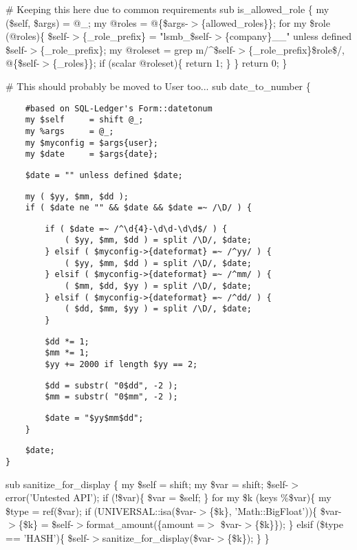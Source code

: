 \# Keeping this here due to common requirements
sub is\_allowed\_role \{
    my (\$self, \$args) = @\_;
    my @roles = @\{\$args-$>$\{allowed\_roles\}\};
    for my \$role (@roles)\{
        \$self-$>$\{\_role\_prefix\} = "lsmb\_\$self-$>$\{company\}\_\_" unless defined \$self-$>$\{\_role\_prefix\};
        my @roleset = grep m/\^{}\$self-$>$\{\_role\_prefix\}\$role\$/, @\{\$self-$>$\{\_roles\}\};
        if (scalar @roleset)\{
            return 1;
        \}
    \}
    return 0; 
\}



\# This should probably be moved to User too...
sub date\_to\_number \{

\begin{verbatim}
    #based on SQL-Ledger's Form::datetonum
    my $self     = shift @_;
    my %args     = @_;
    my $myconfig = $args{user};
    my $date     = $args{date};
\end{verbatim}
\begin{verbatim}
    $date = "" unless defined $date;
\end{verbatim}
\begin{verbatim}
    my ( $yy, $mm, $dd );
    if ( $date ne "" && $date && $date =~ /\D/ ) {
\end{verbatim}
\begin{verbatim}
        if ( $date =~ /^\d{4}-\d\d-\d\d$/ ) {
            ( $yy, $mm, $dd ) = split /\D/, $date;
        } elsif ( $myconfig->{dateformat} =~ /^yy/ ) {
            ( $yy, $mm, $dd ) = split /\D/, $date;
        } elsif ( $myconfig->{dateformat} =~ /^mm/ ) {
            ( $mm, $dd, $yy ) = split /\D/, $date;
        } elsif ( $myconfig->{dateformat} =~ /^dd/ ) {
            ( $dd, $mm, $yy ) = split /\D/, $date;
        }
\end{verbatim}
\begin{verbatim}
        $dd *= 1;
        $mm *= 1;
        $yy += 2000 if length $yy == 2;
\end{verbatim}
\begin{verbatim}
        $dd = substr( "0$dd", -2 );
        $mm = substr( "0$mm", -2 );
\end{verbatim}
\begin{verbatim}
        $date = "$yy$mm$dd";
    }
\end{verbatim}
\begin{verbatim}
    $date;
}
\end{verbatim}


sub sanitize\_for\_display \{
    my \$self = shift;
    my \$var = shift;
    \$self-$>$error('Untested API');
    if (!\$var)\{ 
	\$var = \$self;
    \}
    for my \$k (keys \%\$var)\{
	my \$type = ref(\$var);
	if (UNIVERSAL::isa(\$var-$>$\{\$k\}, 'Math::BigFloat'))\{
              \$var-$>$\{\$k\} = 
                  \$self-$>$format\_amount(\{amount =$>$ \$var-$>$\{\$k\}\});
	\}
	elsif (\$type == 'HASH')\{
               \$self-$>$sanitize\_for\_display(\$var-$>$\{\$k\});
        \}
    \}



